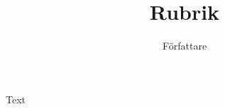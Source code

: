 \documentclass[a4paper]{memoir}
\title{Rubrik}
\author{Författare}
\begin{document}
\maketitle

Text
\end{document}
